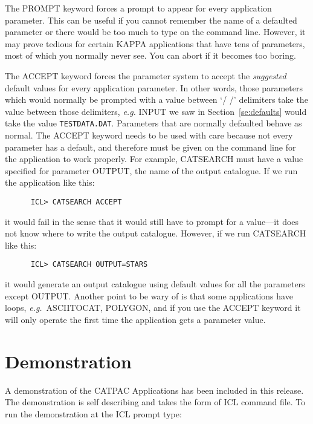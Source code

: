The PROMPT keyword forces a prompt to appear for every application parameter. 
This can be useful if you cannot remember the name of a defaulted parameter or
there would be too much to type on the command line.  However, it may prove
tedious for certain {\small KAPPA} applications that have tens of parameters,
most of which you normally never see.  You can abort if it becomes too boring.

The ACCEPT keyword forces the parameter system to accept the {\em suggested}
default values for every application parameter.  In other words, those
parameters which would normally be prompted with a value between `/ /'
delimiters take the value between those delimiters, {\it e.g.}  INPUT we saw in
Section~\ref{se:defaults} would take the value {\tt TESTDATA.DAT}.  Parameters
that are normally defaulted behave as normal.  The ACCEPT keyword needs to be
used with care because not every parameter has a default, and therefore must be
given on the command line for the application to work properly. For example,
CATSEARCH must have a value specified for parameter OUTPUT, the name of the
output catalogue. If we run the application like this:

\begin{verbatim}
      ICL> CATSEARCH ACCEPT
\end{verbatim}

it would fail in the sense that it would still have to prompt for a value---it
does not know where to write the output catalogue. However, if we run CATSEARCH
like this:

\begin{verbatim}
      ICL> CATSEARCH OUTPUT=STARS 
\end{verbatim}

it would generate an output catalogue using default values for all the
parameters except OUTPUT. Another point to be wary of is that some applications
have loops, {\it e.g.}\ ASCIITOCAT, POLYGON, and if you use the ACCEPT keyword
it will only operate the first time the application gets a parameter value. 

\section {Demonstration}

A demonstration of the CATPAC Applications has been included in this release.
The demonstration is self describing and takes the form of ICL command file.
To run the demonstration at the ICL prompt type:

